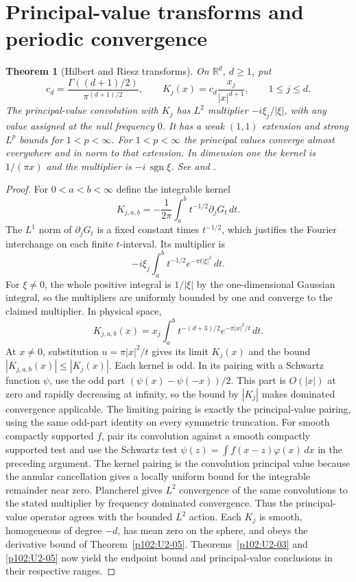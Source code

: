 \documentclass[11pt,oneside,openany]{book}
\newtheorem{theorem}{Theorem}[chapter]
\theoremstyle{definition}
\theoremstyle{remark}
\begin{document}
\section{Principal-value transforms and periodic convergence}

\begin{theorem}[Hilbert and Riesz transforms]
\label{p102:U3-03}
On \(\mathbb R^d\), \(d\ge1\), put
\[
 c_d=\frac{\Gamma((d+1)/2)}{\pi^{(d+1)/2}},\qquad
 K_j(x)=c_d\frac{x_j}{|x|^{d+1}},\qquad 1\le j\le d .
\]
The principal-value convolution with \(K_j\) has \(L^2\) multiplier \(-i\xi_j/|\xi|\), with any value assigned at the null frequency \(0\). It has a weak \((1,1)\) extension and strong \(L^p\) bounds for \(1<p<\infty\). For \(1<p<\infty\) the principal values converge almost everywhere and in norm to that extension. In dimension one the kernel is \(1/(\pi x)\) and the multiplier is \(-i\,\operatorname{sgn}\xi\). See \cite[\S5.1]{grafakos} and \cite[Chapter III, \S1]{stein}.
\end{theorem}
\begin{proof}
For \(0<a<b<\infty\) define the integrable kernel
\[
 K_{j,a,b}=-\frac1{2\pi}\int_a^b t^{-1/2}\partial_jG_t\,dt .
\]
The \(L^1\) norm of \(\partial_jG_t\) is a fixed constant times \(t^{-1/2}\), which justifies the Fourier interchange on each finite \(t\)-interval. Its multiplier is
\[
 -i\xi_j\int_a^b t^{-1/2}e^{-\pi t|\xi|^2}\,dt .
\]
For \(\xi\ne0\), the whole positive integral is \(1/|\xi|\) by the one-dimensional Gaussian integral, so the multipliers are uniformly bounded by one and converge to the claimed multiplier. In physical space,
\[
 K_{j,a,b}(x)=x_j\int_a^b t^{-(d+3)/2}e^{-\pi|x|^2/t}\,dt .
\]
At \(x\ne0\), substitution \(u=\pi|x|^2/t\) gives its limit \(K_j(x)\) and the bound \(|K_{j,a,b}(x)|\le|K_j(x)|\). Each kernel is odd. In its pairing with a Schwartz function \(\psi\), use the odd part \((\psi(x)-\psi(-x))/2\). This part is \(O(|x|)\) at zero and rapidly decreasing at infinity, so the bound by \(|K_j|\) makes dominated convergence applicable. The limiting pairing is exactly the principal-value pairing, using the same odd-part identity on every symmetric truncation. For smooth compactly supported \(f\), pair its convolution against a smooth compactly supported test and use the Schwartz test \(\psi(z)=\int f(x-z)\varphi(x)\,dx\) in the preceding argument. The kernel pairing is the convolution principal value because the annular cancellation gives a locally uniform bound for the integrable remainder near zero. Plancherel gives \(L^2\) convergence of the same convolutions to the stated multiplier by frequency dominated convergence. Thus the principal-value operator agrees with the bounded \(L^2\) action. Each \(K_j\) is smooth, homogeneous of degree \(-d\), has mean zero on the sphere, and obeys the derivative bound of Theorem~\ref{p102:U2-05}. Theorems~\ref{p102:U2-03} and \ref{p102:U2-05} now yield the endpoint bound and principal-value conclusions in their respective ranges.
\end{proof}
\end{document}
